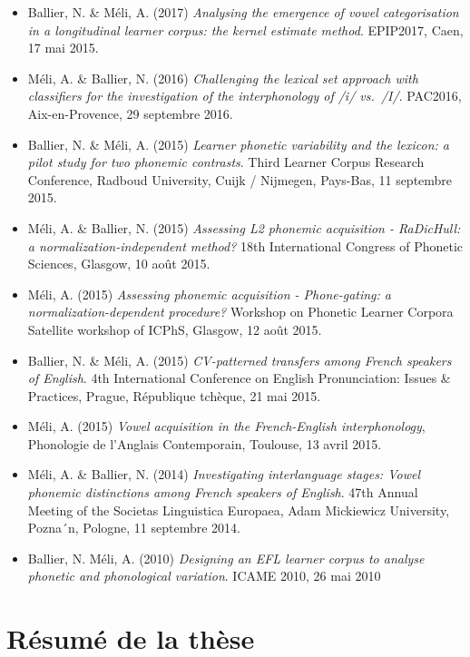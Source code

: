 \documentclass[
  10pt,
]{article}
\begin{document}
\begin{itemize}
\item
  Ballier, N. \& Méli, A. (2017) \emph{Analysing the emergence of vowel categorisation in a longitudinal learner
  corpus: the kernel estimate method}. EPIP2017, Caen, 17 mai 2015.
\item
  Méli, A. \& Ballier, N. (2016) \emph{Challenging the lexical set approach with classifiers for the investigation of the interphonology of /i/ vs.~/I/}. PAC2016, Aix-en-Provence, 29 septembre 2016.
\item
  Ballier, N. \& Méli, A. (2015) \emph{Learner phonetic variability and the lexicon: a pilot study for two phonemic contrasts}. Third Learner Corpus Research Conference, Radboud University, Cuijk / Nijmegen, Pays-Bas, 11 septembre 2015.
\item
  Méli, A. \& Ballier, N. (2015) \emph{Assessing L2 phonemic acquisition - RaDicHull: a normalization-independent method?} 18th International Congress of Phonetic Sciences, Glasgow, 10 août 2015.
\item
  Méli, A. (2015) \emph{Assessing phonemic acquisition - Phone-gating: a normalization-dependent procedure?} Workshop on Phonetic Learner Corpora Satellite workshop of ICPhS, Glasgow, 12 août 2015.
\item
  Ballier, N. \& Méli, A. (2015) \emph{CV-patterned transfers among French speakers of English}. 4th International Conference on English Pronunciation: Issues \& Practices, Prague, République tchèque, 21 mai 2015.
\item
  Méli, A. (2015) \emph{Vowel acquisition in the French-English interphonology}, Phonologie de l'Anglais Contemporain, Toulouse, 13 avril 2015.
\item
  Méli, A. \& Ballier, N. (2014) \emph{Investigating interlanguage stages: Vowel phonemic distinctions among French speakers of English}. 47th Annual Meeting of the Societas Linguistica Europaea, Adam Mickiewicz University, Pozna´n, Pologne, 11 septembre 2014.
\item
  Ballier, N. Méli, A. (2010) \emph{Designing an EFL learner corpus to analyse phonetic and phonological variation}. ICAME 2010, 26 mai 2010
\end{itemize}

\pagebreak

\hypertarget{ruxe9sumuxe9-de-la-thuxe8se}{%
\section{Résumé de la thèse}\label{ruxe9sumuxe9-de-la-thuxe8se}}
\end{document}
